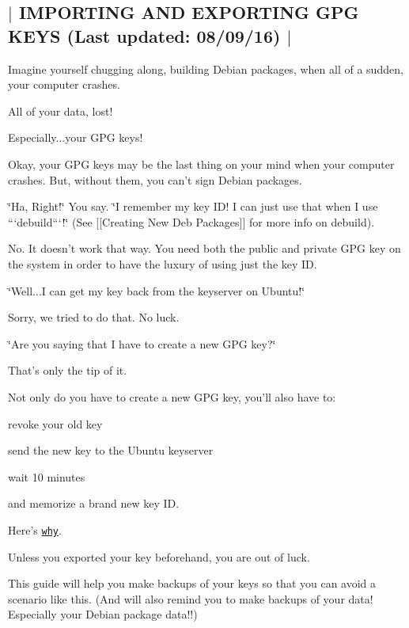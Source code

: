 

 \subsection*{$\vert$ I\-M\-P\-O\-R\-T\-I\-N\-G A\-N\-D E\-X\-P\-O\-R\-T\-I\-N\-G G\-P\-G K\-E\-Y\-S (Last updated\-: 08/09/16) $\vert$ }

Imagine yourself chugging along, building Debian packages, when all of a sudden, your computer crashes.

All of your data, lost!

Especially...your G\-P\-G keys!

Okay, your G\-P\-G keys may be the last thing on your mind when your computer crashes. But, without them, you can't sign Debian packages.

\char`\"{}\-Ha, Right!\char`\"{} You say. \char`\"{}\-I remember my key I\-D! I can just use that when I use ```debuild```!\char`\"{} (See \mbox{[}\mbox{[}Creating New Deb Packages\mbox{]}\mbox{]} for more info on {\ttfamily debuild}).

No. It doesn't work that way. You need both the public and private G\-P\-G key on the system in order to have the luxury of using just the key I\-D.

\char`\"{}\-Well...\-I can get my key back from the keyserver on Ubuntu!\char`\"{}

Sorry, we tried to do that. No luck.

\char`\"{}\-Are you saying that I have to create a new G\-P\-G key?\char`\"{}

That's only the tip of it.

Not only do you have to create a new G\-P\-G key, you'll also have to\-:


\begin{DoxyItemize}
\item revoke your old key
\item send the new key to the Ubuntu keyserver
\item wait 10 minutes
\item and memorize a brand new key I\-D.
\end{DoxyItemize}

Here's \href{http://askubuntu.com/questions/191767/is-it-possible-to-recover-a-secret-key-from-a-gpg-public-key}{\tt why}.

Unless you exported your key beforehand, you are out of luck.

This guide will help you make backups of your keys so that you can avoid a scenario like this. (And will also remind you to make backups of your data! Especially your Debian package data!!) 


